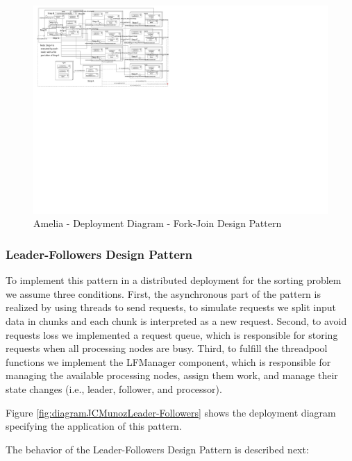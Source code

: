 \begin{landscape}
	\begin{figure}[p!]
		\centering
		\includegraphics[trim=2cm 50cm -6cm 0cm, scale=0.46]{fig/JCMunozDistributedFJ.pdf}
		\caption{Amelia - Deployment Diagram - Fork-Join Design Pattern}
		\label{fig:diagramJCMunozDistributedFJ}
	\end{figure}
\end{landscape}

\subsubsection{Leader-Followers Design Pattern}
To implement this pattern in a distributed deployment for the sorting problem we assume three conditions. First, the asynchronous part of the pattern is realized by using threads to send requests, to simulate requests we split input data in chunks and each chunk is interpreted as a new request. Second, to avoid requests loss we implemented a request queue, which is responsible for storing requests when all processing nodes are busy. Third, to fulfill the threadpool functions we implement the LFManager component, which is responsible for managing the available processing nodes, assign them work, and manage their state changes (i.e., leader, follower, and processor). 

Figure \ref{fig:diagramJCMunozLeader-Followers} shows the deployment diagram specifying the application of this pattern.

The behavior of the Leader-Followers Design Pattern is described next:

